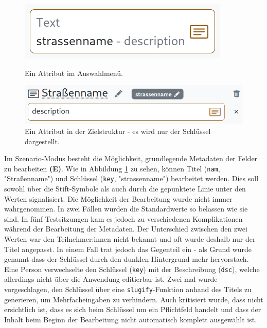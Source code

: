 \begin{figure}[!ht]
  \includegraphics[width=\linewidth]{assets/attribute-source.png}
  \caption{Ein Attribut im Auswahlmenü.}
  \label{fig:attribute-source}
  \endminipage
  \hfill
  \includegraphics[width=\linewidth]{assets/attribute-target.png}
  \caption{Ein Attribut in der Zielstruktur - es wird nur der Schlüssel dargestellt.}
  \label{fig:attribute-target}
  \endminipage
\end{figure}

Im Szenario-Modus besteht die Möglichkeit, grundlegende Metadaten der Felder zu bearbeiten \textbf{(E)}. Wie in Abbildung \ref{fig:attribute-target} zu sehen, können Titel (\texttt{nam}, "Straßenname") und Schlüssel (\texttt{key}, "strassenname") bearbeitet werden. Dies soll sowohl über die Stift-Symbole als auch durch die gepunktete Linie unter den Werten signalisiert. Die Möglichkeit der Bearbeitung wurde nicht immer wahrgenommen. In zwei Fällen wurden die Standardwerte so belassen wie sie sind. In fünf Testsitzungen kam es jedoch zu verschiedenen Komplikationen während der Bearbeitung der Metadaten. Der Unterschied zwischen den zwei Werten war den Teilnehmer:innen nicht bekannt und oft wurde deshalb nur der Titel angepasst. In einem Fall trat jedoch das Gegenteil ein - als Grund wurde genannt dass der Schlüssel durch den dunklen Hintergrund mehr hervorstach. Eine Person verwechselte den Schlüssel (\texttt{key}) mit der Beschreibung (\texttt{dsc}), welche allerdings nicht über die Anwendung editierbar ist. Zwei mal wurde vorgeschlagen, den Schlüssel über eine \texttt{slugify}-Funktion anhand des Titels zu generieren, um Mehrfacheingaben zu verhindern. Auch kritisiert wurde, dass nicht ersichtlich ist, dass es sich beim Schlüssel um ein Pflichtfeld handelt und dass der Inhalt beim Beginn der Bearbeitung nicht automatisch komplett ausgewählt ist.

